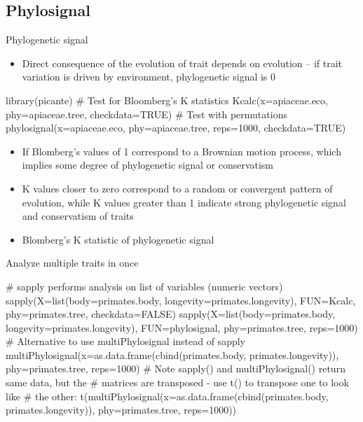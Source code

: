 \documentclass[compress, ucs, xelatex, 11pt, xcolor=svgnames,
  hyperref={
    bookmarks=true,
    unicode=true,
    colorlinks=true,
    pdftitle={Molecular data in R},
    plainpages=false,
    pdfauthor={Vojtech Zeisek},
    pdfsubject={Course about phylogeny and evolution in R},
    pdfcreator={XeLaTeX},
    pdfkeywords={R, evolution, phylogeny, molecular data},
    linkcolor=Tomato,
    anchorcolor=SaddleBrown,
    citecolor=Goldenrod,
    filecolor=DarkMagenta,
    menucolor=Sienna,
    urlcolor=DarkTurquoise,
    pdftex},
  url={hyphens, lowtilde} %
  ]{beamer}
\begin{document}
\subsection{Phylosignal}

\begin{frame}[fragile]{Phylogenetic signal}
  \begin{itemize}
    \item Direct consequence of the evolution of trait depends on evolution -- if trait variation is driven by environment, phylogenetic signal is 0
  \end{itemize}
\begin{spluscode}
    library(picante)
    # Test for Bloomberg's K statistics
    Kcalc(x=apiaceae.eco, phy=apiaceae.tree, checkdata=TRUE)
    # Test with permutations
    phylosignal(x=apiaceae.eco, phy=apiaceae.tree, reps=1000,
      checkdata=TRUE)
  \end{spluscode}
  \begin{itemize}
    \item If Blomberg's values of 1 correspond to a Brownian motion process, which implies some degree of phylogenetic signal or conservatism
    \item K values closer to zero correspond to a random or convergent pattern of evolution, while K values greater than 1 indicate strong phylogenetic signal and conservatism of traits
    \item Blomberg's K statistic of phylogenetic signal
  \end{itemize}
\end{frame}

\begin{frame}[fragile]{Analyze multiple traits in once}
  \begin{spluscode}
    # sapply performs analysis on list of variables (numeric vectors)
    sapply(X=list(body=primates.body, longevity=primates.longevity),
      FUN=Kcalc, phy=primates.tree, checkdata=FALSE)
    sapply(X=list(body=primates.body, longevity=primates.longevity),
      FUN=phylosignal, phy=primates.tree, reps=1000)
    # Alternative to use multiPhylosignal instead of sapply
    multiPhylosignal(x=as.data.frame(cbind(primates.body,
      primates.longevity)), phy=primates.tree, reps=1000)
    # Note sapply() and multiPhylosignal() return same data, but the
    # matrices are transposed - use t() to transpose one to look like
    # the other:
    t(multiPhylosignal(x=as.data.frame(cbind(primates.body,
      primates.longevity)), phy=primates.tree, reps=1000))
  \end{spluscode}
\end{frame}
\end{document}

